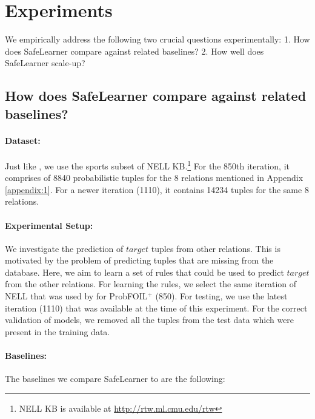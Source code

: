 \documentclass[akbc,twoside,11pt]{article}
\newcommand{\algorithmname}{SafeLearner\xspace}
\begin{document}
\section{Experiments}
\label{sec:exp}
We empirically address the following two crucial questions experimentally: 1. How does \algorithmname compare against related baselines? 2. How well does \algorithmname scale-up?


\subsection{How does \algorithmname compare against related baselines?} \label{exp1}

\paragraph{Dataset:}
Just like \cite{DBLP:conf/ijcai/RaedtDTBV15}, we use the sports subset of NELL KB.\footnote{NELL KB is available at \url{http://rtw.ml.cmu.edu/rtw}} For the 850th iteration, it comprises of 8840 probabilistic tuples for the 8 relations mentioned in Appendix \ref{appendix:1}. %
For a newer iteration (1110), it contains 14234 tuples for the same 8 relations.

\paragraph{Experimental Setup:}
We investigate the prediction of $target$ tuples from other relations. This is motivated by the problem of predicting tuples that are missing from the database. Here, we aim to learn a set of rules that could be used to predict $target$ from the other relations.
For learning the rules, we select the same iteration of NELL that was used by \citet{DBLP:conf/ijcai/RaedtDTBV15} for ProbFOIL$^+$ (850). For testing, we use the latest iteration (1110) that was available at the time of this experiment. For the correct validation of models, we removed all the tuples from the test data which were present in the training data.

\paragraph{Baselines:}
The baselines we compare \algorithmname to are the following:
\end{document}
